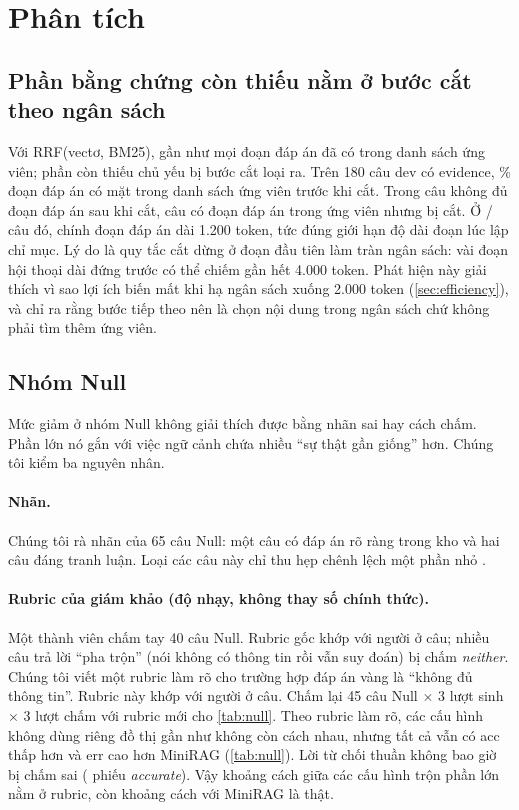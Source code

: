 \section{Phân tích}\label{sec:analysis}

\subsection{Phần bằng chứng còn thiếu nằm ở bước cắt theo ngân sách}\label{sec:residual}
Với RRF(vectơ, BM25), gần như mọi đoạn đáp án đã có trong danh sách ứng viên; phần còn thiếu chủ yếu bị bước cắt loại ra.
Trên 180 câu dev có evidence, \retCandVK\% đoạn đáp án có mặt trong danh sách ứng viên trước khi cắt.
Trong \failVK{} câu không đủ đoạn đáp án sau khi cắt, \cutFailVK{} câu có đoạn đáp án trong ứng viên nhưng bị cắt.
Ở \longAnsCut{}/\cutFailVK{} câu đó, chính đoạn đáp án dài 1.200 token, tức đúng giới hạn độ dài đoạn lúc lập chỉ mục.
Lý do là quy tắc cắt dừng ở đoạn đầu tiên làm tràn ngân sách: vài đoạn hội thoại dài đứng trước có thể chiếm gần hết 4.000 token.
Phát hiện này giải thích vì sao lợi ích biến mất khi hạ ngân sách xuống 2.000 token (\cref{sec:efficiency}), và chỉ ra rằng bước tiếp theo nên là chọn nội dung trong ngân sách chứ không phải tìm thêm ứng viên.

\subsection{Nhóm Null}\label{sec:null}
Mức giảm ở nhóm Null không giải thích được bằng nhãn sai hay cách chấm. Phần lớn nó gắn với việc ngữ cảnh chứa nhiều ``sự thật gần giống'' hơn.
Chúng tôi kiểm ba nguyên nhân.

\paragraph{Nhãn.}
Chúng tôi rà nhãn của 65 câu Null: một câu có đáp án rõ ràng trong kho và hai câu đáng tranh luận.
Loại các câu này chỉ thu hẹp chênh lệch một phần nhỏ .

\paragraph{Rubric của giám khảo (độ nhạy, không thay số chính thức).}
Một thành viên chấm tay 40 câu Null. Rubric gốc khớp với người ở \humanAgreeOrig{} câu; nhiều câu trả lời ``pha trộn'' (nói không có thông tin rồi vẫn suy đoán) bị chấm \emph{neither}.
Chúng tôi viết một rubric làm rõ cho trường hợp đáp án vàng là ``không đủ thông tin''. Rubric này khớp với người ở \humanAgreeClar{} câu.
Chấm lại 45 câu Null $\times$ 3 lượt sinh $\times$ 3 lượt chấm với rubric mới cho \cref{tab:null}.
Theo rubric làm rõ, các cấu hình không dùng riêng đồ thị gần như không còn cách nhau, nhưng tất cả vẫn có acc thấp hơn và err cao hơn MiniRAG (\cref{tab:null}).
Lời từ chối thuần không bao giờ bị chấm sai ( phiếu \emph{accurate}).
Vậy khoảng cách giữa các cấu hình trộn phần lớn nằm ở rubric, còn khoảng cách với MiniRAG là thật.

